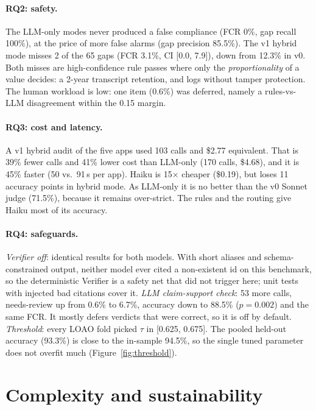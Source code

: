 \paragraph{RQ2: safety.} The LLM-only modes never produced a false compliance (FCR 0\%, gap recall 100\%), at the
price of more false alarms (gap precision 85.5\%). The v1 hybrid mode misses 2 of the 65 gaps (FCR 3.1\%, CI
[0.0, 7.9]), down from 12.3\% in v0. Both misses are high-confidence rule passes where only the \emph{proportionality}
of a value decides: a 2-year transcript retention, and logs without tamper protection. The human workload is low: one
item (0.6\%) was deferred, namely a rules-vs-LLM disagreement within the 0.15 margin.

\paragraph{RQ3: cost and latency.} A v1 hybrid audit of the five apps used 103 calls and \$2.77 equivalent. That is 39\%
fewer calls and 41\% lower cost than LLM-only (170 calls, \$4.68), and it is 45\% faster (50 vs.\ 91\,s per app). Haiku
is 15$\times$ cheaper (\$0.19), but loses 11 accuracy points in hybrid mode. As LLM-only it is no better than the v0
Sonnet judge (71.5\%), because it remains over-strict. The rules and the routing give Haiku most of its accuracy.

\paragraph{RQ4: safeguards.} \emph{Verifier off}: identical results for both models. With short aliases and
schema-constrained output, neither model ever cited a non-existent id on this benchmark, so the deterministic Verifier is
a safety net that did not trigger here; unit tests with injected bad citations cover it. \emph{LLM claim-support
check}: 53 more calls, needs-review up from 0.6\% to 6.7\%, accuracy down to 88.5\% ($p=0.002$) and the same FCR. It
mostly defers verdicts that were correct, so it is off by default. \emph{Threshold}: every LOAO fold picked $\tau$ in
[0.625, 0.675]. The pooled held-out accuracy (93.3\%) is close to the in-sample 94.5\%, so the single tuned parameter
does not overfit much (Figure~\ref{fig:threshold}).

\section{Complexity and sustainability}
\label{section:complexity}

